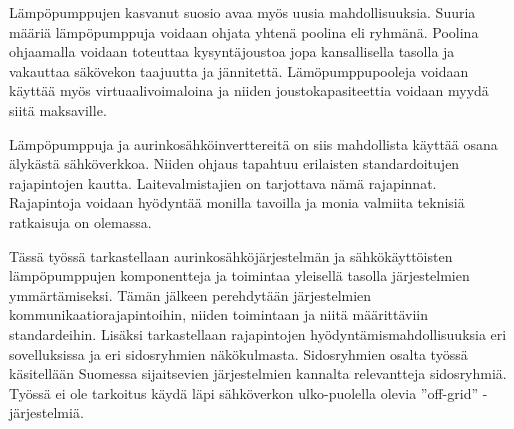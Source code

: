 Lämpöpumppujen kasvanut suosio avaa myös uusia mahdollisuuksia. Suuria määriä lämpöpumppuja voidaan ohjata yhtenä poolina eli ryhmänä. Poolina ohjaamalla voidaan toteuttaa kysyntäjoustoa jopa kansallisella tasolla ja vakauttaa säkövekon taajuutta ja jännitettä. Lämöpumppupooleja voidaan käyttää myös virtuaalivoimaloina ja niiden joustokapasiteettia voidaan myydä siitä maksaville\parencite{ShenJiangLi, fischerTriebelSelinger}.

Lämpöpumppuja ja aurinkosähköinverttereitä on siis mahdollista käyttää osana älykästä sähköverkkoa. Niiden ohjaus tapahtuu erilaisten standardoitujen rajapintojen kautta. Laitevalmistajien on tarjottava nämä rajapinnat. Rajapintoja voidaan hyödyntää monilla tavoilla ja monia valmiita teknisiä ratkaisuja on olemassa.

Tässä työssä tarkastellaan aurinkosähköjärjestelmän ja sähkökäyttöisten lämpöpumppujen komponentteja ja toimintaa yleisellä tasolla järjestelmien ymmärtämiseksi. Tämän jälkeen perehdytään järjestelmien kommunikaatiorajapintoihin, niiden toimintaan ja niitä määrittäviin standardeihin. Lisäksi tarkastellaan rajapintojen hyödyntämismahdollisuuksia eri sovelluksissa ja eri sidosryhmien näkökulmasta. Sidosryhmien osalta työssä käsitellään Suomessa sijaitsevien järjestelmien kannalta relevantteja sidosryhmiä. Työssä ei ole tarkoitus käydä läpi sähköverkon ulko-puolella olevia ”off-grid” -järjestelmiä.
